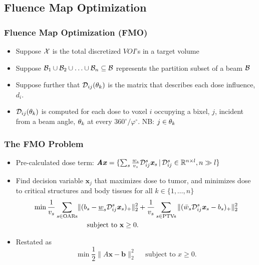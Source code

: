 \subsection{Fluence Map Optimization}
\begin{frame}
\frametitle{Fluence Map Optimization (FMO)}
\begin{itemize}
	\item Suppose $\mathcal{X}$ is the total discretized $VOI$'s in a target volume
	\vspace{0.1in}
	\item Suppose $\mathcal{B}_1 \cup \mathcal{B}_2 \cup \ldots \cup \mathcal{B}_n \subseteq \mathcal{B}$ represents the partition subset of a  beam $\mathcal{B}$
	\vspace{0.1in}
	\item Suppose further that $\mathcal{D}_{ij}(\theta_k)$ is the matrix that describes each dose influence, $d_i$.
	\vspace{0.1in}
	\item $\mathcal{D}_{ij}(\theta_k)$ is computed for each dose to voxel $i$ occupying a bixel, $j$, incident from a beam angle, $\theta_k$ at every $360^\circ/\varphi^\circ$. NB: $j \in \theta_k$
\end{itemize}
\end{frame}
%
\begin{frame}
\frametitle{The FMO Problem}
\begin{itemize}
\item Pre-calculated dose term:  $\textbf{\textit{A}}\textbf{\textit{x}} = \{\sum_s\frac{w_s}{v_s} \mathcal{D}_{ij}^s \textbf{\textit{x}}_s  \, | \, \mathcal{D}_{ij}^s \in \mathbb{R}^{n \times l}, n \gg l \}$%
%
\vspace{0.1in}
%
\item Find decision variable $\textbf{x}_j$ that maximizes dose to tumor, and  minimizes dose to critical structures and body tissues for all $k \in \{1, \ldots, n\}$
%
\vspace{0.1in}
%
\small \begin{align}
\small 
\min \frac{1}{v_s}\sum_{s \in \text{OARs}}  &\|(b_s - \underline{w}_s \mathcal{D}_{ij}^s \textbf{\textit{x}}_s)_+ \|_2^2 + \frac{1}{v_s}\sum_{s \in \text{PTVs}}  \|(\bar{w}_s \mathcal{D}_{ij}^s \textbf{\textit{x}}_s - b_s)_+\|_2^2 \nonumber \\
&\quad  \text{ subject to }  \textbf{x} \ge 0. \nonumber
\end{align}
%
\item Restated as
\[
\min \frac{1}{2}\|A \textbf{x} - \textbf{b}\|_2^2  \quad \text{ subject to }  x \ge 0.
\]
\end{itemize}
\end{frame}
